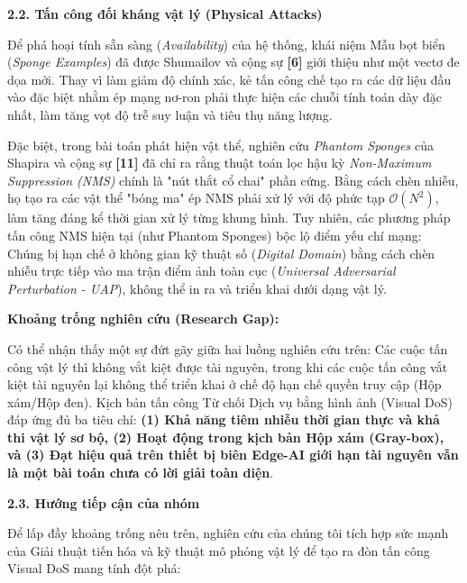 \textbf{2.2. Tấn công đối kháng vật lý (Physical Attacks)}

Để phá hoại tính sẵn sàng (\emph{Availability}) của hệ thống, khái niệm
Mẫu bọt biển (\emph{Sponge Examples}) đã được Shumailov và cộng sự
\textbf{{[}6{]}} giới thiệu như một vectơ đe dọa mới. Thay vì làm giảm
độ chính xác, kẻ tấn công chế tạo ra các dữ liệu đầu vào đặc biệt nhằm
ép mạng nơ-ron phải thực hiện các chuỗi tính toán dày đặc nhất, làm tăng
vọt độ trễ suy luận và tiêu thụ năng lượng.

Đặc biệt, trong bài toán phát hiện vật thể, nghiên cứu \emph{Phantom
Sponges} của Shapira và cộng sự \textbf{{[}11{]}} đã chỉ ra rằng thuật
toán lọc hậu kỳ \emph{Non-Maximum Suppression (NMS)} chính là "nút thắt
cổ chai" phần cứng. Bằng cách chèn nhiễu, họ tạo ra các vật thể "bóng
ma" ép NMS phải xử lý với độ phức tạp
\(\mathcal{O}\left( N^{2} \right)\), làm tăng đáng kể thời gian xử lý
từng khung hình. Tuy nhiên, các phương pháp tấn công NMS hiện tại (như
Phantom Sponges) bộc lộ điểm yếu chí mạng: Chúng bị hạn chế ở không gian
kỹ thuật số (\emph{Digital Domain}) bằng cách chèn nhiễu trực tiếp vào
ma trận điểm ảnh toàn cục (\emph{Universal Adversarial Perturbation -
UAP}), không thể in ra và triển khai dưới dạng vật lý.

\textbf{Khoảng trống nghiên cứu (Research Gap):}

Có thể nhận thấy một sự đứt gãy giữa hai luồng nghiên cứu trên: Các cuộc
tấn công vật lý thì không vắt kiệt được tài nguyên, trong khi các cuộc
tấn công vắt kiệt tài nguyên lại không thể triển khai ở chế độ hạn chế
quyền truy cập (Hộp xám/Hộp đen). Kịch bản tấn công Từ chối Dịch vụ bằng
hình ảnh (Visual DoS) đáp ứng đủ ba tiêu chí: \textbf{(1) Khả năng tiêm
nhiễu thời gian thực và khả thi vật lý sơ bộ, (2) Hoạt động trong kịch
bản Hộp xám (Gray-box), và (3) Đạt hiệu quả trên thiết bị biên Edge-AI
giới hạn tài nguyên vẫn là một bài toán chưa có lời giải toàn diện}.

\textbf{2.3. Hướng tiếp cận của nhóm}

Để lấp đầy khoảng trống nêu trên, nghiên cứu của chúng tôi tích hợp sức
mạnh của Giải thuật tiến hóa và kỹ thuật mô phỏng vật lý để tạo ra đòn
tấn công Visual DoS mang tính đột phá:

